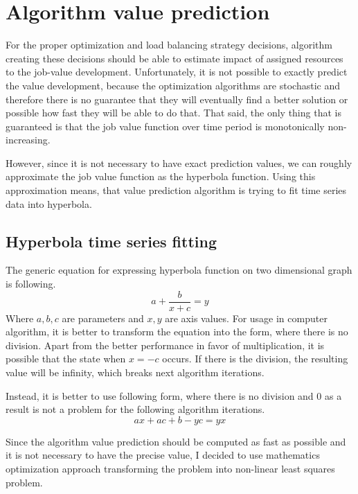\section{Algorithm value prediction}\label{sec:algorithm-value-prediction}

For the proper optimization and load balancing strategy decisions,
algorithm creating these decisions should be able to estimate impact of assigned resources to the job-value development.
Unfortunately, 
it is not possible to exactly predict the value development,
because the optimization algorithms are stochastic 
and therefore there is no guarantee that they will eventually find a better solution
or possible how fast they will be able to do that.
That said, 
the only thing that is guaranteed is that the job value function over time period is monotonically non-increasing.

However,
since it is not necessary to have exact prediction values,
we can roughly approximate the job value function as the hyperbola function.
Using this approximation means,
that value prediction algorithm is trying to fit time series data into hyperbola.

\subsection{Hyperbola time series fitting}
The generic equation for expressing hyperbola function on two dimensional graph is following.
\begin{equation}
    a + \dfrac{b}{x+c} = y
\end{equation}
Where $a,b,c$ are parameters and $x,y$ are axis values.
For usage in computer algorithm,
it is better to transform the equation into the form, 
where there is no division.
Apart from the better performance in favor of multiplication\cite{LeFevre1999},
it is possible that the state when $x = -c$ occurs.
If there is the division,
the resulting value will be infinity,
which breaks next algorithm iterations.

Instead,
it is better to use following form, 
where there is no division and $0$ as a result is not a problem for the following algorithm iterations.
\begin{equation}\label{eq:final-hyperbola-fc}
    ax + ac + b - yc = yx
\end{equation}

Since the algorithm value prediction should be computed as fast as possible
and it is not necessary to have the precise value,
I decided to use mathematics optimization approach transforming the problem into non-linear least squares problem.

